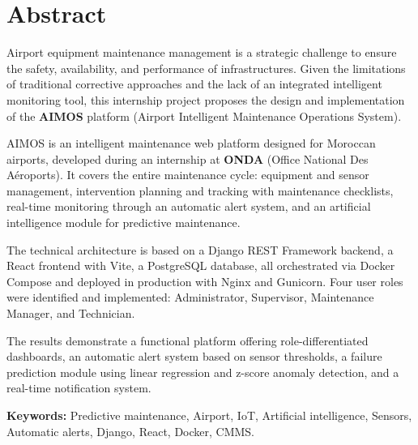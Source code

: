 \chapter*{Abstract}

Airport equipment maintenance management is a strategic challenge to ensure the safety, availability, and performance of infrastructures. Given the limitations of traditional corrective approaches and the lack of an integrated intelligent monitoring tool, this internship project proposes the design and implementation of the \textbf{AIMOS} platform (Airport Intelligent Maintenance Operations System).

AIMOS is an intelligent maintenance web platform designed for Moroccan airports, developed during an internship at \textbf{ONDA} (Office National Des Aéroports). It covers the entire maintenance cycle: equipment and sensor management, intervention planning and tracking with maintenance checklists, real-time monitoring through an automatic alert system, and an artificial intelligence module for predictive maintenance.

The technical architecture is based on a Django REST Framework backend, a React frontend with Vite, a PostgreSQL database, all orchestrated via Docker Compose and deployed in production with Nginx and Gunicorn. Four user roles were identified and implemented: Administrator, Supervisor, Maintenance Manager, and Technician.

The results demonstrate a functional platform offering role-differentiated dashboards, an automatic alert system based on sensor thresholds, a failure prediction module using linear regression and z-score anomaly detection, and a real-time notification system.

\vspace{0.5cm}
\noindent\textbf{Keywords:} Predictive maintenance, Airport, IoT, Artificial intelligence, Sensors, Automatic alerts, Django, React, Docker, CMMS.
